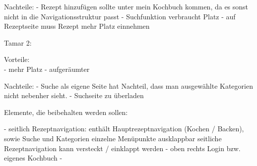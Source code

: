 \documentclass[parskip,10pt,abstracton]{scrartcl}
\begin{document}
Nachteile:
- Rezept hinzufügen sollte unter mein Kochbuch kommen, da es sonst nicht in die Navigationsstruktur passt
- Suchfunktion verbraucht Platz
- auf Rezeptseite muss Rezept mehr Platz einnehmen

Tamar 2:

Vorteile: \\
- mehr Platz
- aufgeräumter

Nachteile:
- Suche als eigene Seite hat Nachteil, dass man ausgewählte Kategorien nicht nebenher sieht.
- Suchseite zu überladen




Elemente, die beibehalten werden sollen:

- seitlich Rezeptnavigation: enthält Hauptrezeptnavigation (Kochen / Backen), sowie Suche und Kategorien
  einzelne Menüpunkte ausklappbar
  seitliche Rezeptnavigation kann versteckt / einklappt werden
- oben rechts Login bzw. eigenes Kochbuch
- 
\end{document}
